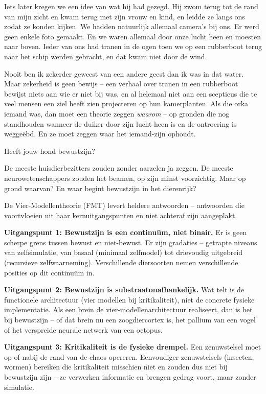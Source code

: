 \documentclass[11pt, twoside, openright]{book}
\begin{document}
Iets later kregen we een idee van wat hij had gezegd. Hij zwom terug tot de rand van mijn zicht en kwam terug met zijn vrouw en kind, en leidde ze langs ons zodat ze konden kijken. We hadden natuurlijk allemaal camera's bij ons. Er werd geen enkele foto gemaakt. En we waren allemaal door onze lucht heen en moesten naar boven. Ieder van ons had tranen in de ogen toen we op een rubberboot terug naar het schip werden gebracht, en dat kwam niet door de wind.

Nooit ben ik zekerder geweest van een andere geest dan ik was in dat water. Maar zekerheid is geen bewijs -- een verhaal over tranen in een rubberboot bewijst niets aan wie er niet bij was, en al helemaal niet aan een scepticus die te veel mensen een ziel heeft zien projecteren op hun kamerplanten. Als die orka iemand was, dan moet een theorie zeggen \textit{waarom} -- op gronden die nog standhouden wanneer de duiker door zijn lucht heen is en de ontroering is weggeëbd. En ze moet zeggen waar het iemand-zijn ophoudt.

Heeft jouw hond bewustzijn?

De meeste huisdierbezitters zouden zonder aarzelen ja zeggen. De meeste neurowetenschappers zouden het beamen, op zijn minst voorzichtig. Maar op grond waarvan? En waar begint bewustzijn in het dierenrijk?

De Vier-Modellentheorie (FMT) levert heldere antwoorden -- antwoorden die voortvloeien uit haar kernuitgangspunten en niet achteraf zijn aangeplakt.

\textbf{Uitgangspunt 1: Bewustzijn is een continuüm, niet binair.} Er is geen scherpe grens tussen bewust en niet-bewust. Er zijn gradaties -- getrapte niveaus van zelfsimulatie, van basaal (minimaal zelfmodel) tot drievoudig uitgebreid (recursieve zelfwaarneming). Verschillende diersoorten nemen verschillende posities op dit continuüm in.

\textbf{Uitgangspunt 2: Bewustzijn is substraatonafhankelijk.} Wat telt is de functionele architectuur (vier modellen bij kritikaliteit), niet de concrete fysieke implementatie. Als een brein de vier-modellenarchitectuur realiseert, dan is het bij bewustzijn -- of dat brein nu een zoogdiercortex is, het pallium van een vogel of het verspreide neurale netwerk van een octopus.

\textbf{Uitgangspunt 3: Kritikaliteit is de fysieke drempel.} Een zenuwstelsel moet op of nabij de rand van de chaos opereren. Eenvoudiger zenuwstelsels (insecten, wormen) bereiken die kritikaliteit misschien niet en zouden dus niet bij bewustzijn zijn -- ze verwerken informatie en brengen gedrag voort, maar zonder simulatie.
\end{document}
